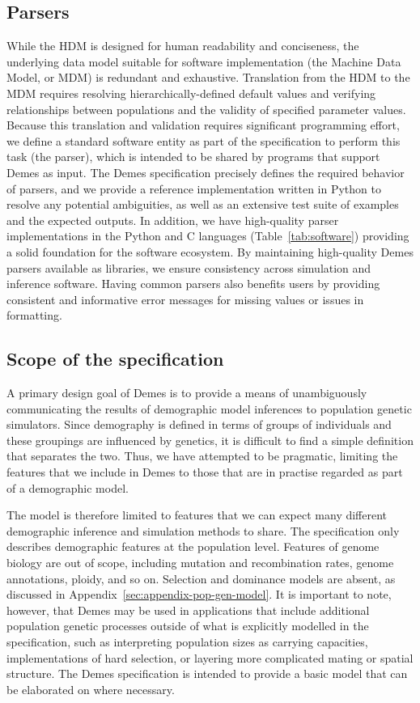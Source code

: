 \documentclass[11pt]{article}
\begin{document}
\subsection*{Parsers}

While the HDM is designed for human readability and
conciseness, the underlying data model suitable for software implementation
(the Machine Data Model, or MDM)
is redundant and exhaustive.
Translation from the HDM to the MDM
requires resolving hierarchically-defined default values and verifying
relationships between populations and the validity of specified parameter
values.
Because this translation and validation requires significant
programming effort, we define a standard software entity as part of the
specification to perform this task (the parser),
which is intended to be shared by programs that support Demes as input.
The Demes specification precisely defines the required behavior of parsers,
and we provide a reference implementation written in Python to resolve any
potential ambiguities, as well as an extensive test suite of examples and the
expected outputs. In addition, we have high-quality parser implementations in
the Python and C languages (Table~\ref{tab:software})
providing a solid foundation for the software ecosystem.
By maintaining high-quality Demes parsers available as libraries,
we ensure consistency across simulation and inference
software.
Having common parsers also benefits users by providing
consistent and informative error messages for missing values or
issues in formatting.

\subsection*{Scope of the specification}

A primary design goal of Demes is to provide a means of
unambiguously communicating the results of demographic
model inferences to population genetic simulators.
Since demography is defined in terms of groups of individuals
and these groupings are influenced by genetics,
it is difficult to find a simple definition that separates
the two. Thus, we have attempted to be pragmatic,
limiting the features that we include in Demes to
those that are in practise regarded as part of a demographic model.

The model is therefore limited to features that we can expect many different
demographic inference and simulation methods to share. The specification only
describes demographic features at the population level. Features of genome
biology are out of scope, including mutation and recombination rates,
genome annotations, ploidy, and so on. Selection and dominance models are
absent, as discussed in Appendix~\ref{sec:appendix-pop-gen-model}.
It is important to note, however, that Demes may be used in applications that
include additional population genetic processes outside of what is explicitly
modelled in the specification, such as interpreting population sizes as
carrying capacities, implementations of hard selection, or layering more
complicated mating or spatial structure. The Demes specification
is intended to provide a basic model that can be elaborated on where necessary.
\end{document}
